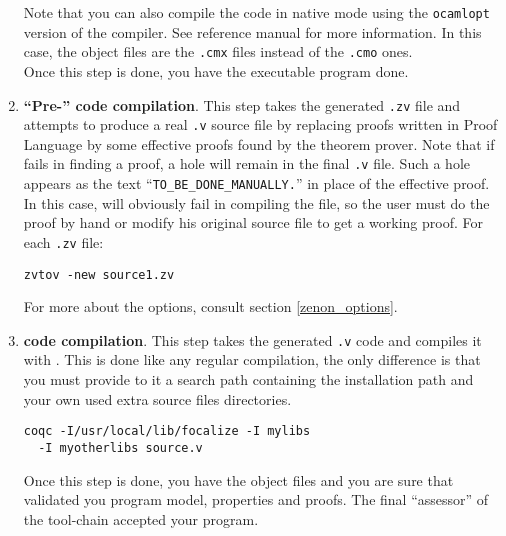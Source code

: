 \begin{enumerate}
    Note that you can also compile the {\ocaml} code in native mode
    using the {\tt ocamlopt} version of the {\ocaml} compiler. See
    {\ocaml} reference manual for more information. In this case, the
    object files are the {\tt .cmx} files instead of the {\tt .cmo}
    ones.\\
    Once this step is done, you have the executable program done.

  \item {\bf ``Pre-''{\coq} code compilation}. This step takes the
    generated {\tt .zv} file and attempts to produce a real {\coq}
    {\tt .v} source file by replacing proofs written in {\focal} Proof
    Language by some effective {\coq} proofs found by the {\zenon}
    theorem prover. Note that if {\zenon} fails in finding a proof, a
    hole will remain in the final {\coq} {\tt .v} file. Such a hole
    appears as the text ``{\tt TO\_BE\_DONE\_MANUALLY.}'' in place of
    the effective proof. In this case, {\coq} will obviously fail
    in compiling the file, so the user must do the proof by hand or
    modify his original {\focal} source file to get a working proof.
    For each {\tt .zv} file:
    \begin{center}
      {\tt zvtov -new source1.zv}
    \end{center}
    For more about the {\zenon} options, consult section
    \ref{zenon_options}.

  \item{\bf {\coq} code compilation}. This step takes the generated
    {\tt .v} code and compiles it with {\coq}. This is done like any
    regular {\coq} compilation, the only difference is that you must
    provide to it a search path containing the {\focal} installation
    path and your own used extra {\focal} source files directories.
    \begin{verbatim}
coqc -I/usr/local/lib/focalize -I mylibs
  -I myotherlibs source.v
    \end{verbatim}
    Once this step is done, you have the {\coq} object files and you
    are sure that {\coq} validated you program model, properties and
    proofs. The final ``assessor'' of the tool-chain accepted your
    program.
\end{enumerate}
